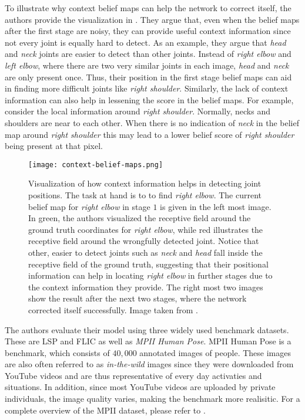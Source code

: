 To illustrate why context belief maps can help the network to correct itself, the authors provide the visualization in .
They argue that, even when the belief maps after the first stage are noisy, they can provide useful context information since not every joint is equally hard to detect.
As an example, they argue that \textit{head} and \textit{neck} joints are easier to detect than other joints.
Instead of \textit{right elbow} and \textit{left elbow}, where there are two very similar joints in each image, \textit{head} and \textit{neck} are only present once.
Thus, their position in the first stage belief maps can aid in finding more difficult joints like \textit{right shoulder}.
Similarly, the lack of context information can also help in lessening the score in the belief maps.
For example, consider the local information around \textit{right shoulder}.
Normally, necks and shoulders are near to each other.
When there is no indication of \textit{neck} in the belief map around \textit{right shoulder} this may lead to a lower belief score of \textit{right shoulder} being present at that pixel. 

\begin{figure}[htb!]
    \centering
    \texttt{[image: context-belief-maps.png]}
    \caption{Visualization of how context information helps in detecting joint positions. The task at hand is to to find \textit{right elbow}. The current belief map for \textit{right elbow} in stage $1$ is given in the left most image. In green, the authors visualized the receptive field around the ground truth coordinates for \textit{right elbow}, while red illustrates the receptive field around the wrongfully detected joint. Notice that other, easier to detect joints such as \textit{neck} and \textit{head} fall inside the receptive field of the ground truth, suggesting that their positional information can help in locating \textit{right elbow} in further stages due to the context information they provide. The right most two images show the result after the next two stages, where the network corrected itself successfully. Image taken from \cite{wei_convolutional_2016}.}
    \label{fig:context-belief-maps}
\end{figure}

\label{sec:pose-machine-evaluation}

The authors evaluate their model using three widely used benchmark datasets.
These are LSP and FLIC  as well as \textit{MPII Human Pose}.  
MPII Human Pose is a benchmark, which consists of $40,000$ annotated images of people.
These images are also often referred to as \textit{in-the-wild} images since they were downloaded from YouTube videos and are thus representative of every day activaties and situations.
In addition, since most YouTube videos are uploaded by private individuals, the image quality varies, making the benchmark more realisitic.
For a complete overview of the MPII dataset, please refer to .

